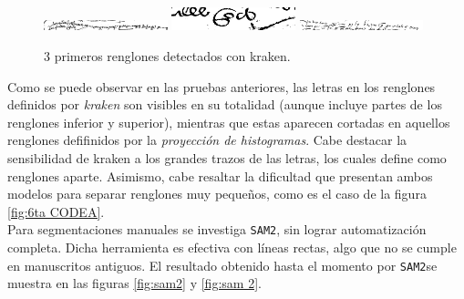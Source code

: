 \documentclass[11pt,a4paper]{article}
\begin{document}
\begin{figure}[H] 
\centering 
\begin{minipage}{1.0\textwidth} 
\includegraphics[width=0.32\textwidth]{7_CODEA_1_kraken.png} 
\includegraphics[width=0.32\textwidth]{7_CODEA_2_kraken.png} 
\includegraphics[width=0.32\textwidth]{7_CODEA_3_kraken.png} 
\caption{3 primeros renglones detectados con kraken.} 
\label{fig:3 líneas kraken 7ma CODEA} 
\end{minipage} 
\end{figure}

Como se puede observar en las pruebas anteriores, las letras en los renglones definidos por \textit{kraken} son visibles en su totalidad (aunque incluye partes de los renglones inferior y superior), mientras que estas aparecen cortadas en aquellos renglones defifinidos por la \textit{proyección de histogramas}. Cabe destacar la sensibilidad de kraken a los grandes trazos de las letras, los cuales define como renglones aparte. Asimismo, cabe resaltar la dificultad que presentan ambos modelos para separar renglones muy pequeños, como es el caso de la figura \ref{fig:6ta CODEA}. \\

Para segmentaciones manuales se investiga \texttt{SAM2}, sin lograr automatización completa. Dicha herramienta es efectiva con líneas rectas, algo que no se cumple en manuscritos antiguos. El resultado obtenido hasta el momento por \texttt{SAM2}se muestra en las figuras \ref{fig:sam2} y \ref{fig:sam 2}.
\end{document}
